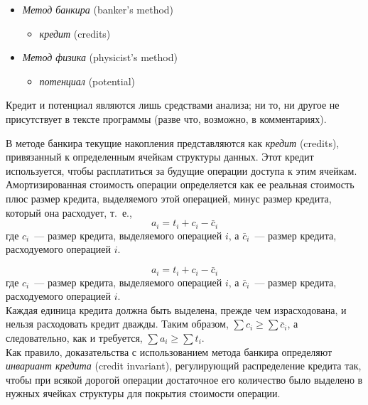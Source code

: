 \documentclass[aspectratio=169
  , xcolor={svgnames}
  , hyperref={ colorlinks,citecolor=DeepPink4
             , linkcolor=DarkRed,urlcolor=DarkBlue}
  , russian
  ]{beamer}
\newcommand{\term}[2]{\textit{#1} (#2)}
\theoremstyle{exerciseStyle1}
\begin{document}
\begin{frame}[fragile]{}
\begin{itemize}
  \item \term{Метод банкира}{banker's method} 
      \begin{itemize}
        \item \term{кредит}{credits}
      \end{itemize}
  \item \term{Метод физика}{physicist's method}
      \begin{itemize}
        \item \term{потенциал}{potential}
      \end{itemize}
\end{itemize}



Кредит и потенциал являются лишь средствами анализа; ни
то, ни другое не присутствует в тексте программы (разве что, возможно,
в комментариях).

\end{frame}

\begin{frame}[fragile]{}
 В методе банкира
текущие накопления представляются как \term{кредит}{credits},
привязанный к определенным ячейкам структуры данных. Этот кредит
используется, чтобы расплатиться за будущие операции доступа к этим
ячейкам.  Амортизированная стоимость операции определяется как ее
реальная стоимость плюс размер кредита, выделяемого этой операцией,
минус размер кредита, который она расходует, т.~е.,
$$
a_i = t_i + c_i - \bar{c}_i
$$
где $c_i$~--- размер кредита, выделяемого операцией $i$, а $\bar{c}_i$~---
размер кредита, расходуемого операцией $i$.


\end{frame}

\begin{frame}[fragile]{}
$$
a_i = t_i + c_i - \bar{c}_i
$$
где $c_i$~--- размер кредита, выделяемого операцией $i$, а $\bar{c}_i$~---
размер кредита, расходуемого операцией $i$.\\

 Каждая единица кредита
должна быть выделена, прежде чем израсходована, и нельзя расходовать
кредит дважды. Таким образом, $\sum c_i \ge \sum \bar{c}_i$, а
следовательно, как и требуется, $\sum a_i \ge \sum t_i$.\\

Как правило,
доказательства с использованием метода банкира определяют
\term{инвариант кредита}{credit invariant}, регулирующий распределение
кредита так, чтобы при всякой дорогой операции достаточное его
количество было выделено в нужных ячейках структуры для покрытия
стоимости операции.
\end{frame}
\end{document}
